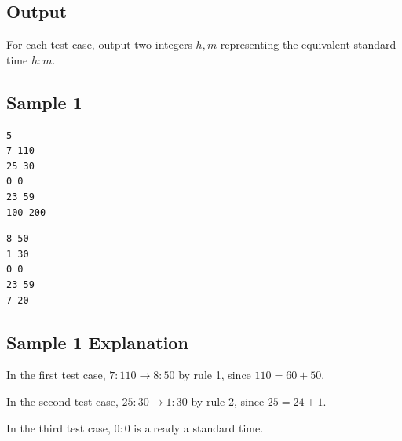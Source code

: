 \subsection{Output}

For each test case, output two integers $h,m$ representing the equivalent standard time $h{:}m$.

\subsection{Sample 1}

\begin{minipage}{\linewidth}
	\begin{minipage}[t]{0.49\linewidth}
		\begin{lstlisting}[title=\texttt{standard input}]
5
7 110
25 30
0 0
23 59
100 200
\end{lstlisting}
	\end{minipage}
	\begin{minipage}[t]{0.49\linewidth}
		\begin{lstlisting}[title=\texttt{standard output}]
8 50
1 30
0 0
23 59
7 20
\end{lstlisting}
	\end{minipage}
\end{minipage}


\subsection{Sample 1 Explanation}

In the first test case, $7{:}110 \to 8{:}50$ by rule 1, since $110=60+50$.

In the second test case, $25{:}30 \to 1{:}30$ by rule 2, since $25=24+1$.

In the third test case, $0{:}0$ is already a standard time.

